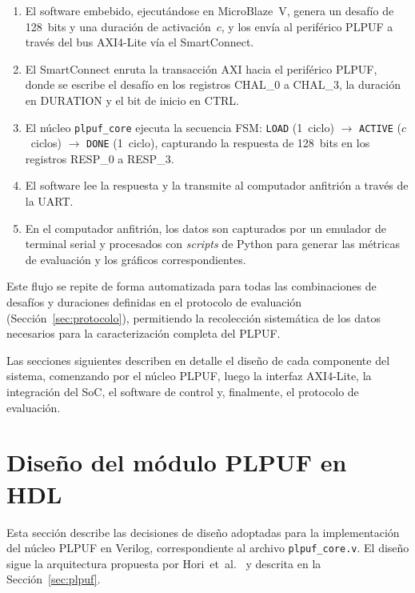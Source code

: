 \begin{enumerate}
  \item[\ding{1}] El software embebido, ejecutándose en MicroBlaze~V, genera un
    desafío de 128~bits y una duración de activación~$c$, y los envía al
    periférico PLPUF a través del bus AXI4-Lite vía el SmartConnect.

  \item[\ding{2}] El SmartConnect enruta la transacción AXI hacia el periférico
    PLPUF, donde se escribe el desafío en los registros CHAL\_0 a
    CHAL\_3, la duración en DURATION y el bit de inicio en CTRL.

  \item[\ding{3}] El núcleo \texttt{plpuf\_core} ejecuta la secuencia FSM:
    \texttt{LOAD} (1~ciclo) $\rightarrow$ \texttt{ACTIVE} ($c$~ciclos)
    $\rightarrow$ \texttt{DONE} (1~ciclo), capturando la respuesta de
    128~bits en los registros RESP\_0 a RESP\_3.

  \item[\ding{4}] El software lee la respuesta y la transmite al computador
    anfitrión a través de la UART.

  \item[\ding{5}] En el computador anfitrión, los datos son capturados por un
    emulador de terminal serial y procesados con \textit{scripts} de Python
    para generar las métricas de evaluación y los gráficos correspondientes.
\end{enumerate}

Este flujo se repite de forma automatizada para todas las combinaciones de
desafíos y duraciones definidas en el protocolo de evaluación
(Sección~\ref{sec:protocolo}), permitiendo la recolección sistemática de los
datos necesarios para la caracterización completa del PLPUF.

Las secciones siguientes describen en detalle el diseño de cada componente
del sistema, comenzando por el núcleo PLPUF, luego la interfaz AXI4-Lite, la
integración del SoC, el software de control y, finalmente, el protocolo de
evaluación.

\section{Diseño del módulo PLPUF en HDL}
\label{sec:diseno_plpuf}

Esta sección describe las decisiones de diseño adoptadas para la
implementación del núcleo PLPUF en Verilog, correspondiente al archivo
\texttt{plpuf\_core.v}. El diseño sigue la arquitectura propuesta por
Hori~et~al.~\cite{hori_2011_pseudolfsr} y descrita en la
Sección~\ref{sec:plpuf}.

